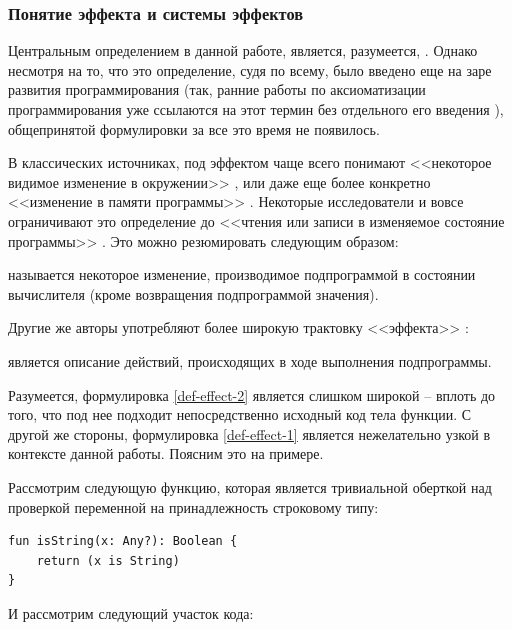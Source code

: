\subsubsection{Понятие эффекта и системы эффектов}

Центральным определением в данной работе, является, разумеется, . Однако несмотря на то, что это определение, судя по всему, было введено еще на заре развития программирования (так, ранние работы по аксиоматизации программирования уже ссылаются на этот термин без отдельного его введения \cite{Hoare69, Schwartz67}), общепринятой формулировки за все это время не появилось. 

В классических источниках, под эффектом чаще всего понимают <<некоторое видимое изменение в окружении>> \cite{Luc88}, или даже еще более конкретно <<изменение в памяти программы>> \cite{Vak09}. Некоторые исследователи и вовсе ограничивают это определение до <<чтения или записи в изменяемое состояние программы>> \cite{Green99}. Это можно резюмировать следующим образом:

\begin{definition}
\label{def-effect-1}
     называется некоторое изменение, производимое подпрограммой в состоянии вычислителя (кроме возвращения подпрограммой значения).
\end{definition}

Другие же авторы употребляют более широкую трактовку <<эффекта>> \cite{Nielson99}: 

\begin{definition}
\label{def-effect-2}
     является описание действий, происходящих в ходе выполнения подпрограммы.
\end{definition}

Разумеется, формулировка \ref{def-effect-2} является слишком широкой -- вплоть до того, что под нее подходит непосредственно исходный код тела функции. С другой же стороны, формулировка \ref{def-effect-1} является нежелательно узкой в контексте данной работы. Поясним это на примере. 

Рассмотрим следующую функцию, которая является тривиальной оберткой над проверкой переменной на принадлежность строковому типу:

\begin{verbatim}
fun isString(x: Any?): Boolean {
    return (x is String)
}
\end{verbatim}

И рассмотрим следующий участок кода:

